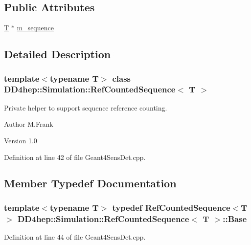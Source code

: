 \subsection*{Public Attributes}
\begin{DoxyCompactItemize}
\item 
\hyperlink{class_t}{T} $\ast$ \hyperlink{class_d_d4hep_1_1_simulation_1_1_ref_counted_sequence_a8fb29db1af39af7f025ed8d1b20b6dfe}{m\_\-sequence}
\end{DoxyCompactItemize}


\subsection{Detailed Description}
\subsubsection*{template$<$typename T$>$ class DD4hep::Simulation::RefCountedSequence$<$ T $>$}

Private helper to support sequence reference counting. \begin{DoxyAuthor}{Author}
M.Frank 
\end{DoxyAuthor}
\begin{DoxyVersion}{Version}
1.0 
\end{DoxyVersion}


Definition at line 42 of file Geant4SensDet.cpp.

\subsection{Member Typedef Documentation}
\hypertarget{class_d_d4hep_1_1_simulation_1_1_ref_counted_sequence_a04dc466201b2e556a020b1282313876c}{
\subsubsection[{Base}]{\setlength{\rightskip}{0pt plus 5cm}template$<$typename T$>$ typedef {\bf RefCountedSequence}$<${\bf T}$>$ {\bf DD4hep::Simulation::RefCountedSequence}$<$ {\bf T} $>$::{\bf Base}}}
\label{class_d_d4hep_1_1_simulation_1_1_ref_counted_sequence_a04dc466201b2e556a020b1282313876c}


Definition at line 44 of file Geant4SensDet.cpp.

